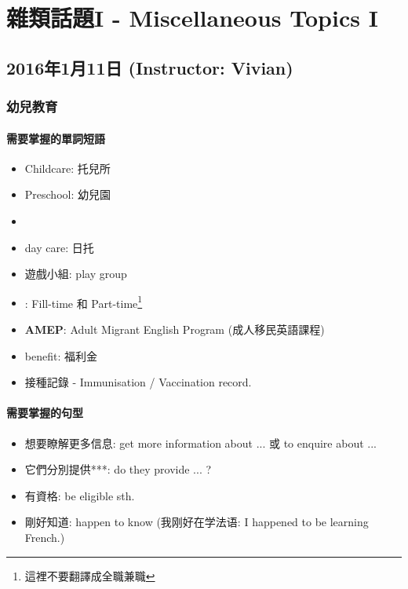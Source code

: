 \chapter{雜類話題I - Miscellaneous Topics I}
\section{2016年1月11日 (Instructor: Vivian)}
\subsection{幼兒教育}
\subsubsection*{需要掌握的單詞短語}
\begin{multicols}{2}
\begin{itemize}
  \itemsep0em
  \item Childcare: 托兒所
  \item Preschool: 幼兒園
  \item {}
  \item day care: 日托
  \item 遊戲小組: play group
  \item {}: Fill-time 和 Part-time\footnote{這裡不要翻譯成全職兼職}
  \item \textbf{AMEP}: Adult Migrant English Program (成人移民英語課程)
  \item benefit: 福利金
  \item 接種記錄 - Immunisation / Vaccination record.
\end{itemize}
\end{multicols}

\subsubsection*{需要掌握的句型}
\begin{itemize}
  \itemsep0em
  \item 想要瞭解更多信息: get more information about ... 或 to enquire about ...
  \item 它們分別提供***: do they  provide ... ?
  \item 有資格: be eligible  sth.
  \item 剛好知道: happen to know (我刚好在学法语: I happened to be learning French.)
\end{itemize}

